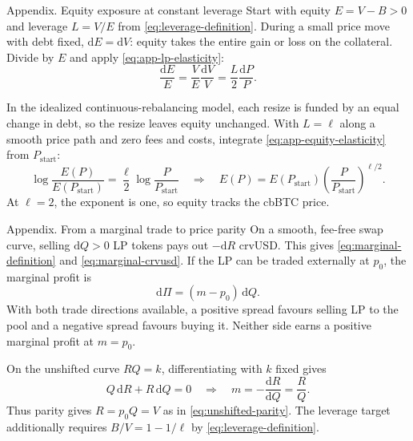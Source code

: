 \documentclass[aspectratio=169,11pt]{beamer}
\begin{document}
\begin{frame}{Appendix. Equity exposure at constant leverage}
  Start with equity $E=V-B>0$ and leverage $L=V/E$ from
  \eqref{eq:leverage-definition}. During a small price move with debt fixed,
  $\mathrm dE=\mathrm dV$: equity takes the entire gain or loss on the collateral.
  Divide by $E$ and apply \eqref{eq:app-lp-elasticity}:
  \begin{equation}\label{eq:app-equity-elasticity}
    \frac{\mathrm dE}{E}
    =\frac{V}{E}\frac{\mathrm dV}{V}
    =\frac{L}{2}\frac{\mathrm dP}{P}.
  \end{equation}

  In the idealized continuous-rebalancing model, each resize is funded
  by an equal change in debt, so the resize leaves equity unchanged.
  With $L=\ell$ along a smooth price path and zero fees and costs, integrate
  \eqref{eq:app-equity-elasticity} from $P_{\mathrm{start}}$:
  \begin{equation}\label{eq:app-equity-path}
    \log\frac{E(P)}{E(P_{\mathrm{start}})}
    =\frac{\ell}{2}\log\frac{P}{P_{\mathrm{start}}}
    \quad\Longrightarrow\quad
    E(P)=E(P_{\mathrm{start}})\left(\frac{P}{P_{\mathrm{start}}}\right)^{\ell/2}.
  \end{equation}
  At $\ell=2$, the exponent is one, so equity tracks the cbBTC price.
\end{frame}

\begin{frame}{Appendix. From a marginal trade to price parity}
  On a smooth, fee-free swap curve, selling $\mathrm dQ>0$ LP tokens
  pays out $-\mathrm dR$ crvUSD. This gives \eqref{eq:marginal-definition}
  and \eqref{eq:marginal-crvusd}. If the LP can be traded externally at
  $p_0$, the marginal profit is
  \begin{equation}\label{eq:app-marginal-profit}
    \mathrm d\Pi=(m-p_0)\,\mathrm dQ.
  \end{equation}
  With both trade directions available, a positive spread favours selling
  LP to the pool and a negative spread favours buying it. Neither side
  earns a positive marginal profit at $m=p_0$.

  On the unshifted curve $RQ=k$, differentiating with $k$ fixed gives
  \begin{equation}\label{eq:app-unshifted-price}
    Q\,\mathrm dR+R\,\mathrm dQ=0
    \quad\Longrightarrow\quad
    m=-\frac{\mathrm dR}{\mathrm dQ}=\frac{R}{Q}.
  \end{equation}
  Thus parity gives $R=p_0Q=V$ as in \eqref{eq:unshifted-parity}.
  The leverage target additionally requires $B/V=1-1/\ell$ by
  \eqref{eq:leverage-definition}.
\end{frame}
\end{document}
